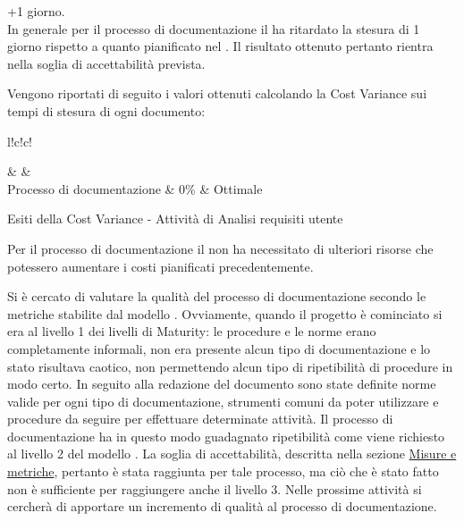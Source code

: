 \documentclass[a4paper, titlepage]{article}
\begin{document}
\begin{description}
\item{} +1 giorno.
\\In generale per il processo di documentazione il  ha ritardato la stesura di 1 giorno rispetto a quanto pianificato nel . Il risultato ottenuto pertanto rientra nella soglia di accettabilità prevista.
\end{description}


Vengono riportati di seguito i valori ottenuti calcolando la Cost Variance sui tempi di stesura di ogni documento:
\begin{tabella}{l!{\VRule}c!{\VRule}c!{\VRule}}
	
	\color{white}  & \color{white}  &\color{white}  \\
	\endfirsthead
	Processo di documentazione & 0\% & Ottimale\\
	\caption{Esiti della Cost Variance - Attività di Analisi requisiti utente}	   	
\end{tabella}

 Per il processo di documentazione il  non ha necessitato di ulteriori risorse che potessero aumentare i costi pianificati precedentemente.

Si è cercato di valutare la qualità del processo di documentazione secondo le metriche stabilite dal modello  . Ovviamente, quando il progetto è cominciato si era al livello 1 dei livelli di Maturity: le procedure e le norme erano completamente informali, non era presente alcun tipo di documentazione e lo stato risultava caotico, non permettendo alcun tipo di ripetibilità di procedure in modo certo.
\newline In seguito alla redazione del documento \NdPdoc sono state definite  norme valide per ogni tipo di documentazione, strumenti comuni
da poter utilizzare e procedure da seguire per effettuare determinate attività. Il processo di documentazione ha in questo modo guadagnato ripetibilità come viene richiesto al livello 2 del modello .
\newline La soglia di accettabilità, descritta nella sezione \hyperref[sec:metr]{Misure e metriche}, pertanto è stata raggiunta per tale processo, ma ciò che è stato fatto non è sufficiente per raggiungere anche il livello 3.
\newline Nelle prossime attività si cercherà di apportare un incremento di qualità al processo di documentazione.
\end{document}
